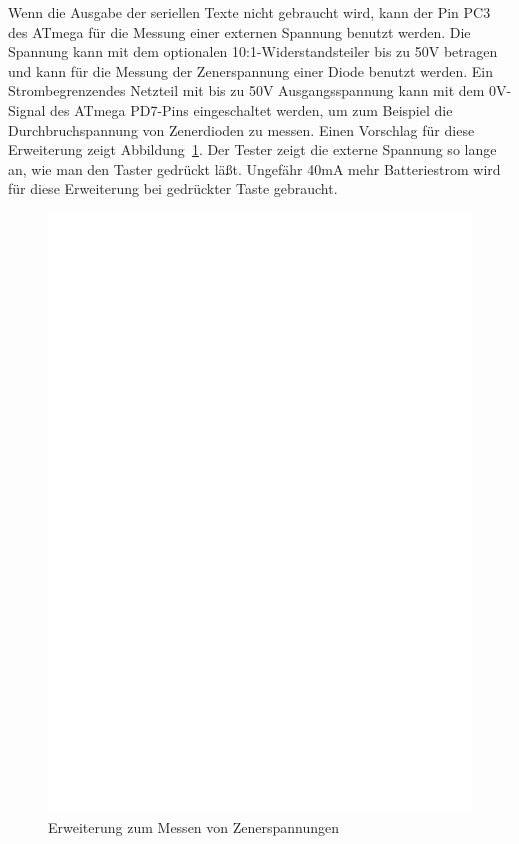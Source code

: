 Wenn die Ausgabe der seriellen Texte nicht gebraucht wird, kann der Pin PC3 des ATmega für die Messung
einer externen Spannung benutzt werden. Die Spannung kann mit dem optionalen 10:1-Widerstandsteiler
bis zu 50V betragen und kann für die Messung der Zenerspannung einer Diode benutzt werden.
Ein Strombegrenzendes Netzteil mit bis zu 50V Ausgangsspannung kann mit dem 0V-Signal des ATmega PD7-Pins
eingeschaltet werden, um zum Beispiel die Durchbruchspannung von Zenerdioden zu messen.
Einen Vorschlag für diese Erweiterung zeigt Abbildung~\ref{fig:zener}.
Der Tester zeigt die externe Spannung so lange an, wie man den Taster gedrückt läßt.
Ungefähr 40mA mehr Batteriestrom wird für diese Erweiterung bei gedrückter Taste gebraucht.

\begin{figure}[H]
\centering
\includegraphics[width=18cm]{../FIG/zener_exp.eps}
\caption{Erweiterung zum Messen von Zenerspannungen}
\label{fig:zener}
\end{figure}

